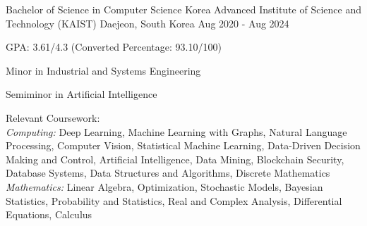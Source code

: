 

\begin{cventries}

  \cventry
    {Bachelor of Science in Computer Science} %
    {Korea Advanced Institute of Science and Technology (KAIST)} %
    {Daejeon, South Korea} %
    {Aug 2020 - Aug 2024} %
    {
      \begin{cvitems} %
        \item {GPA: 3.61/4.3 (Converted Percentage: 93.10/100)}
        \item {Minor in Industrial and Systems Engineering}
        \item {Semiminor in Artificial Intelligence}
        \item {
          Relevant Coursework: \\
          \textit{Computing:} Deep Learning, Machine Learning with Graphs, Natural Language Processing, Computer Vision, Statistical Machine Learning, Data-Driven Decision Making and Control, Artificial Intelligence, Data Mining, Blockchain Security, Database Systems, Data Structures and Algorithms, Discrete Mathematics \\
          \textit{Mathematics:} Linear Algebra, Optimization, Stochastic Models, Bayesian Statistics, Probability and Statistics, Real and Complex Analysis, Differential Equations, Calculus
        }
      \end{cvitems}
    }


\end{cventries}
